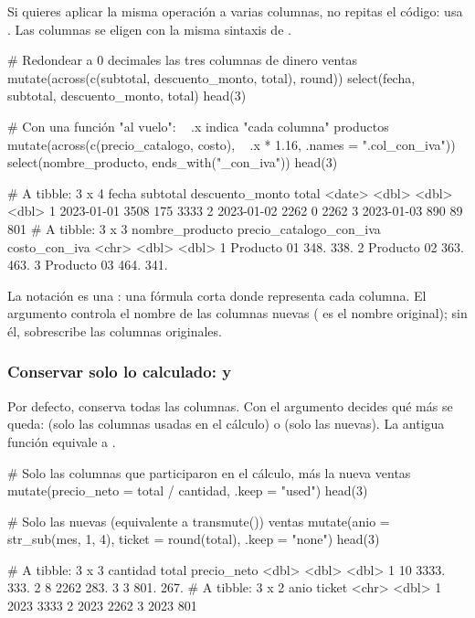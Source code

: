 Si quieres aplicar la misma operación a varias columnas, no repitas el
código: usa . Las columnas se eligen con
la misma sintaxis de .

\begin{rcode}
# Redondear a 0 decimales las tres columnas de dinero
ventas %
  mutate(across(c(subtotal, descuento_monto, total), round)) %
  select(fecha, subtotal, descuento_monto, total) %
  head(3)

# Con una función "al vuelo": ~ .x indica "cada columna"
productos %
  mutate(across(c(precio_catalogo, costo), ~ .x * 1.16,
                .names = "{.col}_con_iva")) %
  select(nombre_producto, ends_with("_con_iva")) %
  head(3)
\end{rcode}
\begin{rsalida}
# A tibble: 3 x 4
  fecha      subtotal descuento_monto total
  <date>        <dbl>           <dbl> <dbl>
1 2023-01-01     3508             175  3333
2 2023-01-02     2262               0  2262
3 2023-01-03      890              89   801
# A tibble: 3 x 3
  nombre_producto precio_catalogo_con_iva costo_con_iva
  <chr>                             <dbl>         <dbl>
1 Producto 01                        348.          338.
2 Producto 02                        363.          463.
3 Producto 03                        464.          341.
\end{rsalida}

La notación  es una : una
fórmula corta donde  representa cada columna. El argumento
 controla el nombre de las columnas nuevas
( es el nombre original); sin él, 
sobrescribe las columnas originales.

\subsubsection{Conservar solo lo calculado: \texorpdfstring{}{.keep} y \texorpdfstring{}{transmute()}}

Por defecto,  conserva todas las columnas. Con el argumento
 decides qué más se queda:  (solo las columnas
usadas en el cálculo) o  (solo las nuevas). La antigua función
 equivale a .

\begin{rcode}
# Solo las columnas que participaron en el cálculo, más la nueva
ventas %
  mutate(precio_neto = total / cantidad, .keep = "used") %
  head(3)

# Solo las nuevas (equivalente a transmute())
ventas %
  mutate(anio = str_sub(mes, 1, 4), ticket = round(total),
         .keep = "none") %
  head(3)
\end{rcode}
\begin{rsalida}
# A tibble: 3 x 3
  cantidad total precio_neto
     <dbl> <dbl>       <dbl>
1       10 3333.        333.
2        8 2262         283.
3        3  801.        267.
# A tibble: 3 x 2
  anio  ticket
  <chr>  <dbl>
1 2023    3333
2 2023    2262
3 2023     801
\end{rsalida}

